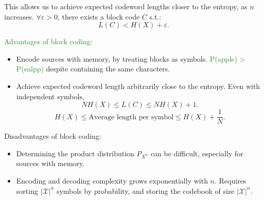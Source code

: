 This allows us to achieve expected codeword lengths closer to the entropy, as
$n$ increases. $\forall\varepsilon>0$, there exists a block code $C$ s.t.:
\[L(C)<H(X)+\varepsilon.\] 

\textcolor{ForestGreen}{Advantages of block coding:}
\begin{itemize}
  \item Encode sources with memory, by treating blocks as symbols.
    \textcolor{ForestGreen}{P(apple) > P(ealpp)} despite containing the same characters.
  \item Achieve expected codeword length arbitrarily close to the entropy. Even with
    independent symbols,
    \[NH(X)\le L(C)\le NH(X)+1.\] 
    \[H(X)\le \text{Average length per symbol}\le H(X)+\frac{1}{N}.\] 
\end{itemize}
\textcolor{Bittersweet}{Disadvantages of block coding:}
\begin{itemize}
  \item Determining the product distribution $P_{X^n}$ can be difficult,
    especially for sources with memory.
  \item Encoding and decoding complexity grows exponentially with $n$. Requires
    sorting $\left| \mathcal{X} \right| ^{n}$ symbols by probability, and
    storing the codebook of size $\left| \mathcal{X} \right| ^{n}$.
\end{itemize}


